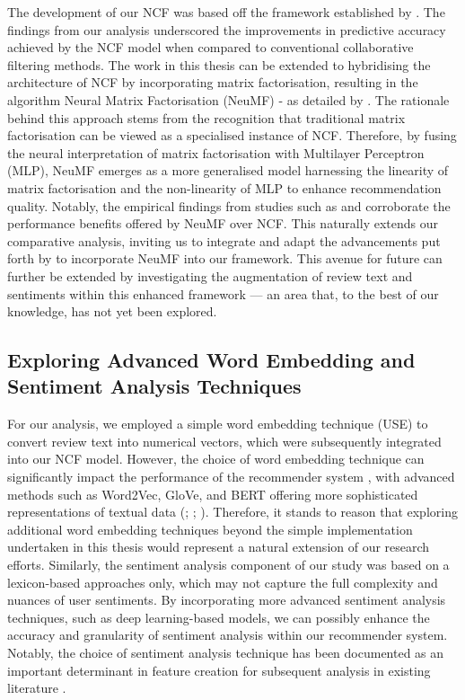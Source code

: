 The development of our NCF was based off the framework established by \cite{he2017neural}. The findings from our analysis underscored the improvements in predictive accuracy achieved by the NCF model when compared to conventional collaborative filtering methods. The work in this thesis can be extended to hybridising the architecture of NCF by incorporating matrix factorisation, resulting in the algorithm Neural Matrix Factorisation (NeuMF) - as detailed by \cite{he2017neural}. The rationale behind this approach stems from the recognition that traditional matrix factorisation can be viewed as a specialised instance of NCF. Therefore, by fusing the neural interpretation of matrix factorisation with Multilayer Perceptron (MLP), NeuMF emerges as a more generalised model harnessing the linearity of matrix factorisation and the non-linearity of MLP to enhance recommendation quality. Notably, the empirical findings from studies such as \cite{zhang2019deep} and \cite{he2017neural} corroborate the performance benefits offered by NeuMF over NCF. This naturally extends our comparative analysis, inviting us to integrate and adapt the advancements put forth by \cite{he2017neural} to incorporate NeuMF into our framework. This avenue for future can further be extended by investigating the augmentation of review text and sentiments within this enhanced framework — an area that, to the best of our knowledge, has not yet been explored.


\subsection{Exploring Advanced Word Embedding and Sentiment Analysis Techniques}

For our analysis, we employed a simple word embedding technique (USE) to convert review text into numerical vectors, which were subsequently integrated into our NCF model. However, the choice of word embedding technique can significantly impact the performance of the recommender system \cite{asudani2023impact}, with advanced methods such as Word2Vec, GloVe, and BERT offering more sophisticated representations of textual data (\cite{mikolov2013distributed}; \cite{pennington2014glove}; \cite{devlin2018bert}). Therefore, it stands to reason that exploring additional word embedding techniques beyond the simple implementation undertaken in this thesis would represent a natural extension of our research efforts. Similarly, the sentiment analysis component of our study was based on a lexicon-based approaches only, which may not capture the full complexity and nuances of user sentiments. By incorporating more advanced sentiment analysis techniques, such as deep learning-based models, we can possibly enhance the accuracy and granularity of sentiment analysis within our recommender system. Notably, the choice of sentiment analysis technique has been documented as an important determinant in feature creation for subsequent analysis in existing literature \cite{ahuja2019impact}. 

